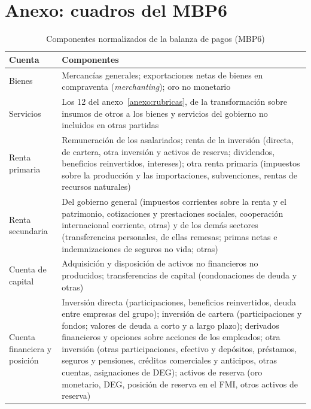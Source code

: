 \documentclass[11pt]{article}
\begin{document}
\section{Anexo: cuadros del MBP6}\label{anexo:mbp6}

\begin{table}[H]
\centering
\caption{Componentes normalizados de la balanza de pagos (MBP6)}\label{tab:componentes-mbp6}
\footnotesize
\begin{tabular}{>{\raggedright\arraybackslash}m{2.9cm}>{\raggedright\arraybackslash}m{12.6cm}}
\toprule
\rowcolor{tceeazulpalido}
\textbf{Cuenta} & \textbf{Componentes} \\
\midrule
Bienes & Mercancías generales; exportaciones netas de bienes en compraventa (\emph{merchanting}); oro no monetario \\
Servicios & Los 12 del anexo~\ref{anexo:rubricas}, de la transformación sobre insumos de otros a los bienes y servicios del gobierno no incluidos en otras partidas \\
Renta primaria & Remuneración de los asalariados; renta de la inversión (directa, de cartera, otra inversión y activos de reserva; dividendos, beneficios reinvertidos, intereses); otra renta primaria (impuestos sobre la producción y las importaciones, subvenciones, rentas de recursos naturales) \\
Renta secundaria & Del gobierno general (impuestos corrientes sobre la renta y el patrimonio, cotizaciones y prestaciones sociales, cooperación internacional corriente, otras) y de los demás sectores (transferencias personales, de ellas remesas; primas netas e indemnizaciones de seguros no vida; otras) \\
Cuenta de capital & Adquisición y disposición de activos no financieros no producidos; transferencias de capital (condonaciones de deuda y otras) \\
Cuenta financiera y posición & Inversión directa (participaciones, beneficios reinvertidos, deuda entre empresas del grupo); inversión de cartera (participaciones y fondos; valores de deuda a corto y a largo plazo); derivados financieros y opciones sobre acciones de los empleados; otra inversión (otras participaciones, efectivo y depósitos, préstamos, seguros y pensiones, créditos comerciales y anticipos, otras cuentas, asignaciones de DEG); activos de reserva (oro monetario, DEG, posición de reserva en el FMI, otros activos de reserva) \\
\bottomrule
\end{tabular}
\end{table}
\end{document}
